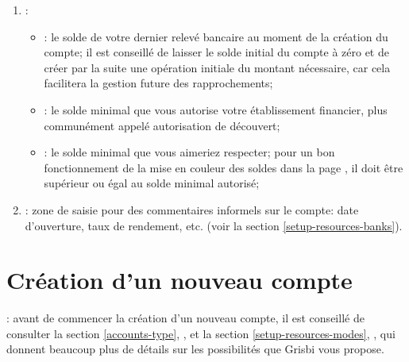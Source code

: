 \begin{enumerate}
\begin{itemize}
			\item {}:	après avoir sélectionné une banque existante, vous pourrez cliquer sur le bouton  ouvrant une fenêtre pour éditer les paramètres de la banque;
			\item {}: le code que vous trouverez sur votre relevé d'identité bancaire (RIB) ou IBAN fourni par la banque (voir la section \vref{setup-resources-banks});
			\item {}: affiche le code de l'établissement financier sélectionné au-dessus;	
			\item {}: l'adresse de votre agence bancaire, à relever également sur votre RIB (voir la section \vref{setup-resources-banks});	
			\item {}: voir sur votre RIB (voir la section \vref{setup-resources-banks});
		\end{itemize}
	\item {}:
		\begin{itemize}
			\item {}: le solde de votre dernier relevé bancaire au moment de la création du compte; il est conseillé de laisser le solde initial du compte à zéro et de créer par la suite une opération initiale du montant nécessaire, car cela facilitera la gestion future des rapprochements;	
			\item {}: le solde minimal que vous autorise votre établissement financier, plus communément appelé autorisation de découvert;	
			\item {}: le solde minimal que vous aimeriez respecter; pour un bon fonctionnement de la mise en couleur des soldes dans la page , il doit être supérieur ou égal au solde minimal autorisé;
		\end{itemize}	
	\item {}: zone de saisie pour des commentaires informels sur le compte: date d'ouverture, taux de rendement, etc. (voir la section \vref{setup-resources-banks}).
\end{enumerate}

\section{Création d'un nouveau compte\label{accounts-new}}


\Note{}: avant de commencer la création d'un nouveau compte, il est conseillé de consulter la section \vref{accounts-type}, , et la section \vref{setup-resources-modes}, , qui donnent beaucoup plus de détails sur les possibilités que Grisbi vous propose.

